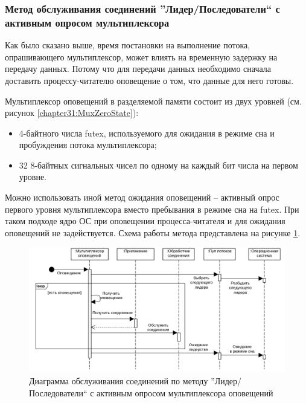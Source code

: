\subsubsection{Метод обслуживания соединений ''Лидер/Последователи`` с активным опросом мультиплексора}\label{chapter31:NonBlockingLF}

Как было сказано выше, время постановки на выполнение потока, опрашивающего мультиплексор, может влиять на временную задержку на передачу данных. Потому что для передачи данных необходимо сначала доставить процессу-читателю оповещение о том, что данные для него готовы.

Мультиплексор оповещений в разделяемой памяти состоит из двух уровней (см. рисунок \ref{chapter31:MuxZeroState}):
\begin{itemize}
\item 4-байтного числа futex, используемого для ожидания в режиме сна и пробуждения потока мультиплексора;
\item 32 8-байтных сигнальных чисел по одному на каждый бит числа на первом уровне.
\end{itemize}

Можно использовать иной метод ожидания оповещений -- активный опрос первого уровня мультиплексора вместо пребывания в режиме сна на futex. При таком подходе ядро ОС при оповещении процесса-читателя и для ожидания оповещений не задействуется.
Схема работы метода представлена на рисунке \ref{chapter31:MuxBusyWaitScheme}.

\begin{figure}[!h]
\caption{Диаграмма обслуживания соединений по методу ''Лидер/Последователи`` с активным опросом мультиплексора оповещений}
\label{chapter31:MuxBusyWaitScheme}
\includegraphics[width=\textwidth]{../../graphics/schemes/LFMuxSequenceSpin}
\end{figure}

